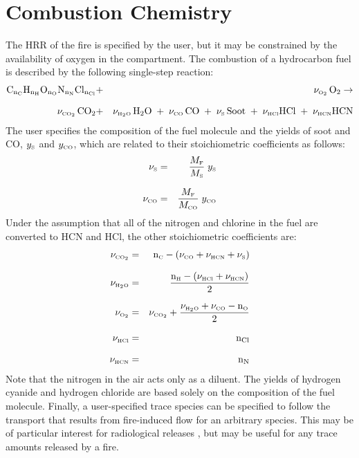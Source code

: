 \section{Combustion Chemistry}

 The HRR of the fire is specified by the user, but it may be constrained by the availability of oxygen in the compartment. The combustion of a hydrocarbon fuel is described by the following single-step reaction:
\begin{eqnarray}
   \mathrm{C_{n_{\tiny \hbox{C}}}H_{n_H}O_{n_O}N_{n_N}Cl_{n_{Cl}}} &+&  \nu_{\tiny \hbox{O}_2} \, \mathrm{O_2}  \rightarrow  \nonumber \\[.1in]
   \nu_{\tiny \hbox{CO}_2} \, \mathrm{CO_2} &+& \nu_{\tiny \hbox{H}_2\hbox{O}} \, \mathrm{H_2O} \; + \; \nu_{\tiny \hbox{CO}} \, \mathrm{CO} \; + \; \nu_{\tiny \hbox{S}} \, \mathrm{Soot} \; + \; \nu_{\tiny \hbox{HCl}} \mathrm{HCl} \; + \; \nu_{\tiny \hbox{HCN}} \mathrm{HCN} \label{stoich}
\end{eqnarray}
The user specifies the composition of the fuel molecule and the yields of soot and CO, $y_{\tiny \hbox{S}}$ and $y_{\tiny \hbox{CO}}$, which are related to their stoichiometric coefficients as follows:
\begin{eqnarray}
   \nu_{\tiny \hbox{S}} &=& \frac{M_{\tiny \hbox{F}}}{M_{\tiny \hbox{S}}} \; y_{\tiny \hbox{S}} \label{soot_yield} \\[.1in]
   \nu_{\tiny \hbox{CO}} &=& \frac{M_{\tiny \hbox{F}}}{M_{\tiny \hbox{CO}}} \; y_{\tiny \hbox{CO}} \label{CO_yield}
\end{eqnarray}
Under the assumption that all of the nitrogen and chlorine in the fuel are converted to HCN and HCl, the other stoichiometric coefficients are:
\begin{eqnarray}
  \nu_{\tiny \hbox{CO}_2} &=& \mathrm{n_{\tiny \hbox{C}}} - { \left( {\nu_{\tiny \hbox{CO}} + \nu_{\tiny \hbox{HCN}} + \nu_{\tiny \hbox{S}}} \right) } \\[.1in]
  \nu_{\tiny \hbox{H}_2\hbox{O}} &=& \frac{\mathrm{n_{\tiny \hbox{H}}} - { \left( {\nu_{\tiny \hbox{HCl}} + \nu_{\tiny \hbox{HCN}}} \right) }}{2} \\[.1in]
  \nu_{\tiny \hbox{O}_2}  &=& \nu_{\tiny \hbox{CO}_2} + \frac{\nu_{\tiny \hbox{H}_2\hbox{O}} + \nu_{\tiny \hbox{CO}} - \mathrm{n_{\tiny \hbox{O}}}}{2} \label{Oxygen_yield} \\[.1in]
  \nu_{\tiny \hbox{HCl}}   &=& \mathrm{n_{Cl}} \\[.1in]
  \nu_{\tiny \hbox{HCN}}   &=& \mathrm{n_{N}}
\end{eqnarray}
Note that the nitrogen in the air acts only as a diluent. The yields of hydrogen cyanide and hydrogen chloride are based solely on the composition of the fuel molecule. Finally, a user-specified trace species can be specified to follow the transport that results from fire-induced flow for an arbitrary species. This may be of particular interest for radiological releases \cite{Jones:2008}, but may be useful for any trace amounts released by a fire.

